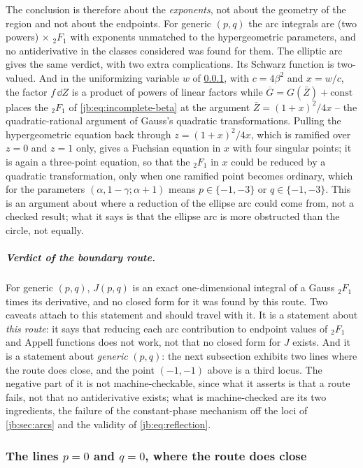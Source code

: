 The conclusion is therefore about the \emph{exponents}, not about the geometry of the region and
not about the endpoints.
For generic $(p, q)$ the arc integrals are (two powers) $\times$ ${}_2F_1$ with exponents unmatched
to the hypergeometric parameters, and no antiderivative in the classes considered was found for
them.
The elliptic arc gives the same verdict, with two extra complications.
Its Schwarz function is two-valued.
And in the uniformizing variable $w$ of \cref{jb:sec:obstruction:closure}, with $c = 4 \beta^2$ and
$x = w / c$, the factor $f \, \dd Z$ is a product of powers of linear factors while
$\overline{G} = G(\bar Z) + \text{const}$ places the ${}_2F_1$ of \eqref{jb:eq:incomplete-beta} at the
argument $\bar Z = (1 + x)^2 / 4 x$ -- the quadratic-rational argument of Gauss's quadratic
transformations.
Pulling the hypergeometric equation back through $z = (1 + x)^2 / 4x$, which is ramified over
$z = 0$ and $z = 1$ only, gives a Fuchsian equation in $x$ with four singular points; it is again a
three-point equation, so that the ${}_2F_1$ in $x$ could be reduced by a quadratic transformation,
only when one ramified point becomes ordinary, which for the parameters
$(\alpha, 1 - \gamma; \alpha + 1)$ means $p \in \{-1, -3\}$ or $q \in \{-1, -3\}$.
This is an argument about where a reduction of the ellipse arc could come from, not a checked
result; what it says is that the ellipse arc is more obstructed than the circle, not equally.

\subparagraph{Verdict of the boundary route.}
For generic $(p, q)$, $J(p, q)$ is an exact one-dimensional integral of a Gauss ${}_2F_1$ times its
derivative, and no closed form for it was found by this route.
Two caveats attach to this statement and should travel with it.
It is a statement about \emph{this route}: it says that reducing each arc contribution to endpoint
values of ${}_2F_1$ and Appell functions does not work, not that no closed form for $J$ exists.
And it is a statement about \emph{generic} $(p, q)$: the next subsection exhibits two lines where
the route does close, and the point $(-1, -1)$ above is a third locus.
The negative part of it is not machine-checkable, since what it asserts is that a route fails,
not that no antiderivative exists; what is machine-checked are its two ingredients, the failure of
the constant-phase mechanism off the loci of \cref{jb:sec:arcs} and the validity of
\eqref{jb:eq:reflection}.


\subsubsection{The lines $p = 0$ and $q = 0$, where the route does close}
\label{jb:sec:obstruction:closure}

